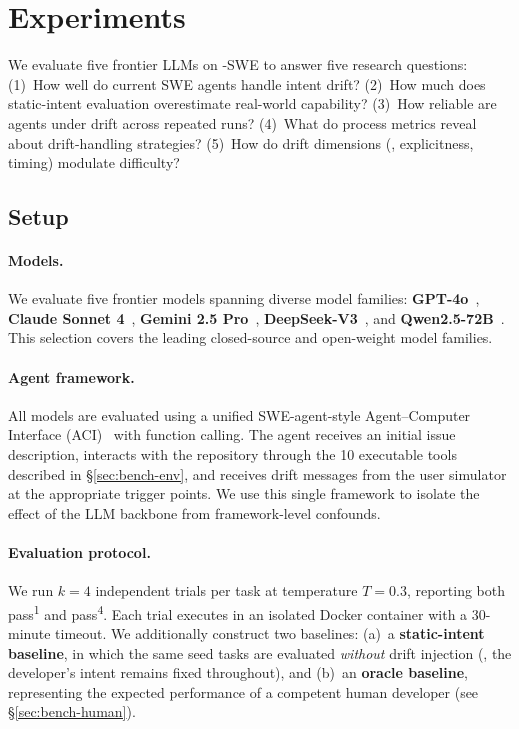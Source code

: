 \section{Experiments}
\label{sec:experiments}

We evaluate five frontier LLMs on \bench{}-SWE to answer five research questions: (1)~How well do current SWE agents handle intent drift? (2)~How much does static-intent evaluation overestimate real-world capability? (3)~How reliable are agents under drift across repeated runs? (4)~What do process metrics reveal about drift-handling strategies? (5)~How do drift dimensions (\eg, explicitness, timing) modulate difficulty?

\subsection{Setup}
\label{sec:setup}

\paragraph{Models.}
We evaluate five frontier models spanning diverse model families: \textbf{GPT-4o}~\citep{openai2024gpt4o}, \textbf{Claude Sonnet 4}~\citep{anthropic2025claude}, \textbf{Gemini 2.5 Pro}~\citep{google2025gemini}, \textbf{DeepSeek-V3}~\citep{deepseek2024v3}, and \textbf{Qwen2.5-72B}~\citep{qwen2024qwen25}. This selection covers the leading closed-source and open-weight model families.

\paragraph{Agent framework.}
All models are evaluated using a unified SWE-agent-style Agent--Computer Interface (ACI)~\citep{yang2024sweagent} with function calling. The agent receives an initial issue description, interacts with the repository through the 10 executable tools described in \S\ref{sec:bench-env}, and receives drift messages from the user simulator at the appropriate trigger points. We use this single framework to isolate the effect of the LLM backbone from framework-level confounds.

\paragraph{Evaluation protocol.}
We run $k = 4$ independent trials per task at temperature $T = 0.3$, reporting both pass\textsuperscript{1} and pass\textsuperscript{4}. Each trial executes in an isolated Docker container with a 30-minute timeout. We additionally construct two baselines: (a)~a \textbf{static-intent baseline}, in which the same seed tasks are evaluated \emph{without} drift injection (\ie, the developer's intent remains fixed throughout), and (b)~an \textbf{oracle baseline}, representing the expected performance of a competent human developer (see \S\ref{sec:bench-human}).

